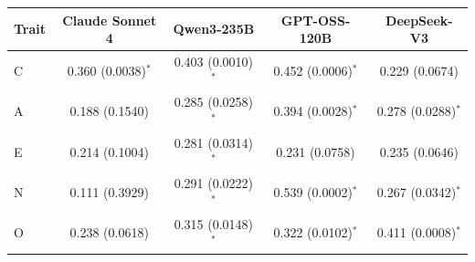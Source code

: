 \begin{tabular}{lcccc}
\toprule
Trait & Claude Sonnet 4 & Qwen3-235B & GPT-OSS-120B & DeepSeek-V3 \\
\midrule
C & 0.360 (0.0038)$^{*}$ & 0.403 (0.0010)$^{*}$ & 0.452 (0.0006)$^{*}$ & 0.229 (0.0674) \\
A & 0.188 (0.1540) & 0.285 (0.0258)$^{*}$ & 0.394 (0.0028)$^{*}$ & 0.278 (0.0288)$^{*}$ \\
E & 0.214 (0.1004) & 0.281 (0.0314)$^{*}$ & 0.231 (0.0758) & 0.235 (0.0646) \\
N & 0.111 (0.3929) & 0.291 (0.0222)$^{*}$ & 0.539 (0.0002)$^{*}$ & 0.267 (0.0342)$^{*}$ \\
O & 0.238 (0.0618) & 0.315 (0.0148)$^{*}$ & 0.322 (0.0102)$^{*}$ & 0.411 (0.0008)$^{*}$ \\
\bottomrule
\end{tabular}
